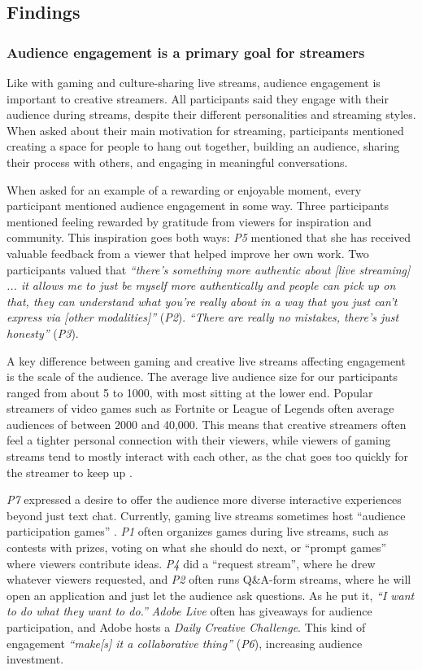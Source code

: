 \subsection{Findings}
\subsubsection{Audience engagement is a primary goal for streamers}
Like with gaming \cite{Pellicone2017, Hamilton2014} and culture-sharing \cite{Lu2019} live streams, audience engagement is important to creative streamers. All participants said they engage with their audience during streams, despite their different personalities and streaming styles. When asked about their main motivation for streaming, participants mentioned creating a space for people to hang out together, building an audience, sharing their process with others, and engaging in meaningful conversations.

When asked for an example of a rewarding or enjoyable moment, every participant mentioned audience engagement in some way. Three participants mentioned feeling rewarded by gratitude from viewers for inspiration and community. This inspiration goes both ways: \textit{P5} mentioned that she has received valuable feedback from a viewer that helped improve her own work. Two participants valued that \textit{``there's something more authentic about [live streaming] ... it allows me to just be myself more authentically and people can pick up on that, they can understand what you're really about in a way that you just can't express via [other modalities]''} (\textit{P2}). \textit{``There are really no mistakes, there's just honesty''} (\textit{P3}).

A key difference between gaming and creative live streams affecting engagement is the scale of the audience. The average live audience size for our participants ranged from about 5 to 1000, with most sitting at the lower end. Popular streamers of video games such as Fortnite or League of Legends often average audiences of between 2000 and 40,000. This means that creative streamers often feel a tighter personal connection with their viewers, while viewers of gaming streams tend to mostly interact with each other, as the chat goes too quickly for the streamer to keep up \cite{Lessel2017, Hu2017}.

\textit{P7} expressed a desire to offer the audience more diverse interactive experiences beyond just text chat. Currently, gaming live streams sometimes host ``audience participation games'' \cite{Glickman2018}. \textit{P1} often organizes games during live streams, such as contests with prizes, voting on what she should do next, or ``prompt games'' where viewers contribute ideas. \textit{P4} did a ``request stream'', where he drew whatever viewers requested, and \textit{P2} often runs Q\&A-form streams, where he will open an application and just let the audience ask questions. As he put it, \textit{``I want to do what they want to do.''} \textit{Adobe Live} often has giveaways for audience participation, and Adobe hosts a \textit{Daily Creative Challenge}. This kind of engagement \textit{``make[s] it a collaborative thing''} (\textit{P6}), increasing audience investment.

